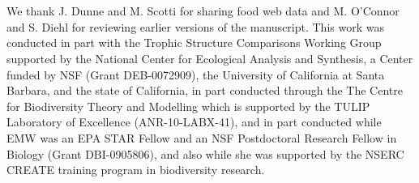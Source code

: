 \documentclass[12pt,a4paper,oneside]{article}
\begin{document}
\\
\newpage
{}\\
\noindent We thank J. Dunne and M. Scotti for sharing
food web data and M. O'Connor and S. Diehl for reviewing earlier versions of the
manuscript. This work was conducted in part with the Trophic
Structure Comparisons Working Group supported by the National Center
for Ecological Analysis and Synthesis, a Center funded by NSF (Grant
DEB-0072909), the University of California at Santa Barbara, and the
state of California, in part conducted through the The Centre for Biodiversity Theory and Modelling which is supported by the TULIP Laboratory of Excellence (ANR-10-LABX-41), and in part conducted while EMW was an EPA STAR
Fellow and an NSF Postdoctoral Research Fellow in Biology (Grant DBI-0905806), and also while she was supported by the NSERC CREATE training program in biodiversity research.  
\end{document}
